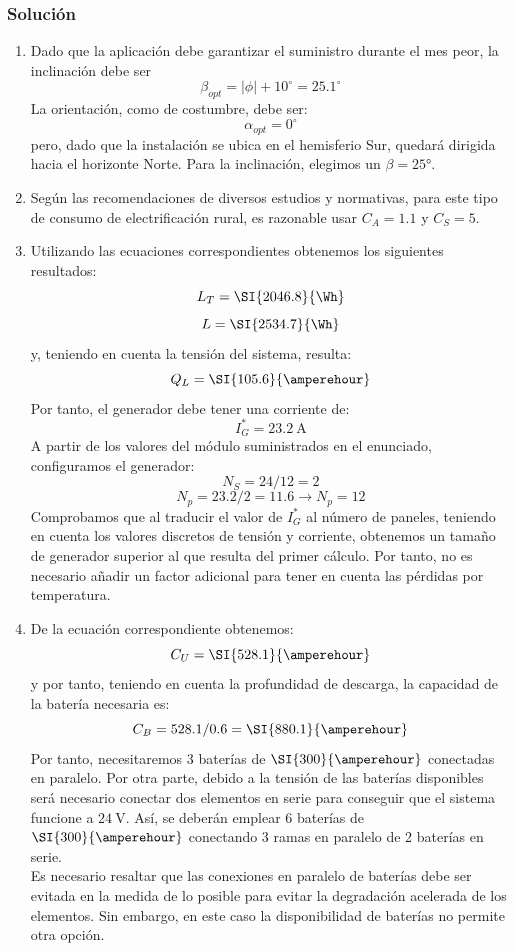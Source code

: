 \subsubsection{Solución}

\begin{enumerate}
\item Dado que la aplicación debe garantizar el suministro durante el mes
peor, la inclinación debe ser\[
\beta_{opt}=|\phi|+10^{\circ}=25.1^{\circ}\]
La orientación, como de costumbre, debe ser:\[
\alpha_{opt}=0^{\circ}\]
pero, dado que la instalación se ubica en el hemisferio Sur, quedará
dirigida hacia el horizonte Norte. Para la inclinación, elegimos un
$\beta=\ang{25}$.
\item Según las recomendaciones de diversos estudios y normativas, para
este tipo de consumo de electrificación rural, es razonable usar $C_{A}=1.1$
y $C_{S}=5$.

\item Utilizando las ecuaciones correspondientes obtenemos
los siguientes resultados:\[
L_{T}=\SI{2046.8}{\Wh}\]
\[
L=\SI{2534.7}{\Wh}\]
y, teniendo en cuenta la tensión del sistema, resulta:\[
Q_{L}=\SI{105.6}{\amperehour}\]
Por tanto, el generador debe tener una corriente de:\[
I_{G}^{*}=\SI{23.2}{\ampere}\]
A partir de los valores del módulo suministrados en el enunciado,
configuramos el generador:\[
N_{S}=24/12=2\]
\[
N_{p}=23.2/2=11.6\rightarrow N_{p}=12\]
Comprobamos que al traducir el valor de $I_{G}^{*}$ al número de
paneles, teniendo en cuenta los valores discretos de tensión y corriente,
obtenemos un tamaño de generador superior al que resulta del primer
cálculo. Por tanto, no es necesario añadir un factor adicional para
tener en cuenta las pérdidas por temperatura.
\item De la ecuación correspondiente obtenemos:\[
C_{U}=\SI{528.1}{\amperehour}\]
y por tanto, teniendo en cuenta la profundidad de descarga, la capacidad
de la batería necesaria es:\[
C_{B}=528.1/0.6=\SI{880.1}{\amperehour}\]
Por tanto, necesitaremos 3 baterías de $\SI{300}{\amperehour}$ conectadas
en paralelo. Por otra parte, debido a la tensión de las baterías disponibles
será necesario conectar dos elementos en serie para conseguir que
el sistema funcione a $\SI{24}{\volt}$. Así, se deberán emplear 6
baterías de $\SI{300}{\amperehour}$ conectando 3 ramas en paralelo
de 2 baterías en serie.\\
Es necesario resaltar que las conexiones en paralelo de baterías
debe ser evitada en la medida de lo posible para evitar la degradación
acelerada de los elementos. Sin embargo, en este caso la disponibilidad
de baterías no permite otra opción. 
\end{enumerate}


